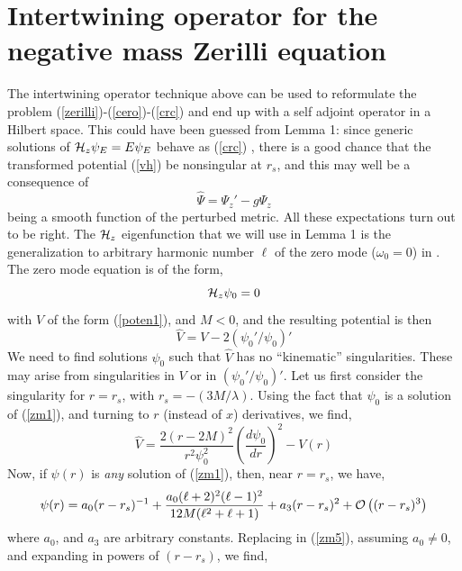 \documentclass[aps,floats,showpacs,amssymb,tightenlines]{revtex4}
\def\w{\omega}
\begin{document}
\section{Intertwining operator for the negative mass Zerilli equation} \label{apli}

The intertwining operator technique above can be used to reformulate the problem (\ref{zerilli})-(\ref{cero})-(\ref{crc})
and end up with a self adjoint operator in a Hilbert space. This could have been  guessed from Lemma 1: since generic
solutions of ${\cal H}_z \psi_E = E \psi_E$ behave as (\ref{crc}) \cite{dg}, there is a good chance
that the transformed potential (\ref{vh}) be nonsingular at $r_s$, and this may well be a consequence of
\begin{equation}\label{hpsi1}
\hat \Psi = \Psi_z' - g \Psi_z
\end{equation}
being a smooth function of the perturbed metric. All these expectations
turn out to be right. The ${\cal H}_z$ eigenfunction that we will use in Lemma 1 is the generalization to
arbitrary harmonic number $\ell$ of the zero mode ($\w_0=0$)
in \cite{ghi}. The zero mode equation is of the form,
\begin{equation}\label{zm1}
{\cal H}_z \psi_0 = 0
\end{equation}
with $V$ of the form (\ref{poten1}), and $M < 0$, and the resulting potential is then
\begin{equation} \label{zm4}
\hat V = V - 2 (\psi_0' / \psi_0 )'
\end{equation}
We need to find solutions $\psi_0$ such that $\hat V$ has no ``kinematic'' singularities. These may arise from singularities in $V$ or in $(\psi_0' / \psi_0 )'$. Let us first consider the singularity for $r=r_s$, with $r_s =-(3 M/\lambda)$. Using the fact that $\psi_0$ is a solution of (\ref{zm1}), and turning to $r$ (instead of $x$) derivatives, we find,
\begin{equation}\label{zm5}
\hat{V} = \frac{2(r-2M)^2}{r^2 \psi_0^2}\left(\frac{d \psi_0}{dr}\right)^2 -V(r)
\end{equation}
Now, if $\psi(r)$ is {\em any} solution of (\ref{zm1}), then, near $r=r_s$, we have,
\begin{equation}\label{zm6}
\psi(r) = a_0 (r-r_s)^{-1}+\frac{a_0(\ell+2)^2(\ell-1)^2}{12 M(\ell^2+\ell+1)}
+a_3(r-r_s)^2+{\cal{O}}\left((r-r_s)^3\right)
\end{equation}
where $a_0$, and $a_3$ are arbitrary constants. Replacing in (\ref{zm5}), assuming $a_0 \neq 0$,
and expanding in powers of $(r-r_s)$, we find,
\end{document}
